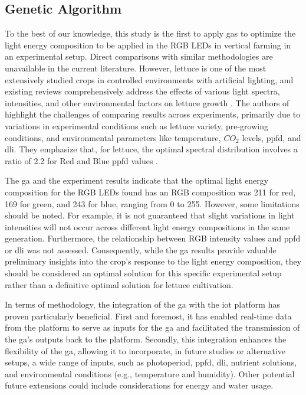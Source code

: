 \documentclass[preprint, review, 12pt]{elsarticle}
\begin{document}
\subsection{Genetic Algorithm}



To the best of our knowledge, this study is the first to apply \gls{ga}s to optimize the light energy composition to be applied in the RGB LEDs in vertical farming in an experimental setup. Direct comparisons with similar methodologies are unavailable in the current literature. However, lettuce is one of the most extensively studied crops in controlled environments with artificial lighting, and existing reviews comprehensively address the effects of various light spectra, intensities, and other environmental factors on lettuce growth \cite{boros2023a}. The authors of \cite{boros2023a} highlight the challenges of comparing results across experiments, primarily due to variations in experimental conditions such as lettuce variety, pre-growing conditions, and environmental parameters like temperature, $CO_2$ levels, \gls{ppfd}, and \gls{dli}. They emphasize that, for lettuce, the optimal spectral distribution involves a ratio of 2.2 for Red and Blue \gls{ppfd} values \cite{boros2023a}. 

The \gls{ga} and the experiment results indicate that the optimal light energy composition for the RGB LEDs found has an RGB composition was 211 for red, 169 for green, and 243 for blue, ranging from 0 to 255. However, some limitations should be noted. For example, it is not guaranteed that slight variations in light intensities will not occur across different light energy compositions in the same generation. Furthermore, the relationship between RGB intensity values and \gls{ppfd} or \gls{dli} was not assessed. 
Consequently, while the \gls{ga} results provide valuable preliminary insights into the crop’s response to the light energy composition, they should be considered an optimal solution for this specific experimental setup rather than a definitive optimal solution for lettuce cultivation.

In terms of methodology, the integration of the \gls{ga} with the \gls{iot} platform has proven particularly beneficial. First and foremost, it has enabled real-time data from the platform to serve as inputs for the \gls{ga} and facilitated the transmission of the \gls{ga}'s outputs back to the platform. Secondly, this integration enhances the flexibility of the \gls{ga}, allowing it to incorporate, in future studies or alternative setups, a wide range of inputs, such as photoperiod, \gls{ppfd}, \gls{dli}, nutrient solutions, and environmental conditions (e.g., temperature and humidity). Other potential future extensions could include considerations for energy and water usage.
\end{document}
